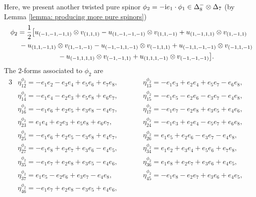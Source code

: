 \documentclass[pdftex]{sigma}
\numberwithin{equation}{section}
\begin{document}
{\allowdisplaybreaks Here, we present another twisted pure spinor $\phi_2=-{\rm i}e_1\cdot \phi_1 \in \Delta_8^-\otimes \Delta_7$ (by Lemma \ref{lemma: producing more pure spinors})
\begin{gather*}
\phi_2 ={1\over 2}\big[ u_{(-1,-1,-1,1)}\otimes v_{(1,1,1)} -u_{(1,-1,-1,-1)}\otimes v_{(1,1,-1)}
 + u_{(1,-1,1,1)}\otimes v_{(1,-1,1)} \\
 \hphantom{\phi_2 =}{} - u_{(1,1,-1,1)}\otimes v_{(1,-1,-1)} - u_{(-1,-1,1,-1)}\otimes v_{(-1,1,1)} + u_{(-1,1,-1,-1)}\otimes v_{(-1,1,-1)}\\
\hphantom{\phi_2 =}{}
 - u_{(-1,1,1,1)}\otimes v_{(-1,-1,1)} + u_{(1,1,1,-1)}\otimes v_{(-1,-1,-1)}\big].
\end{gather*}
The $2$-forms associated to $\phi_2$ are
\begin{alignat*}{3}
& \eta^{\phi_2}_{1 2} = -e_{1} e_{2} - e_{3} e_{4} + e_{5} e_{6} + e_{7} e_{8},\qquad &&
 \eta^{\phi_2}_{1 3} = -e_{1} e_{3} + e_{2} e_{4} + e_{5} e_{7} - e_{6} e_{8},&\\
& \eta^{\phi_2}_{1 4} = -e_{1} e_{4} - e_{2} e_{3} + e_{5} e_{8} + e_{6} e_{7},\qquad &&
 \eta^{\phi_2}_{1 5} = -e_{1} e_{5} - e_{2} e_{6} - e_{3} e_{7} - e_{4} e_{8},&\\
& \eta^{\phi_2}_{1 6} = -e_{1} e_{6} + e_{2} e_{5} + e_{3} e_{8} - e_{4} e_{7},\qquad &&
 \eta^{\phi_2}_{1 7} = -e_{1} e_{7} - e_{2} e_{8} + e_{3} e_{5} + e_{4} e_{6},&\\
& \eta^{\phi_2}_{2 3} = e_{1} e_{4} + e_{2} e_{3} + e_{5} e_{8} + e_{6} e_{7},\qquad &&
 \eta^{\phi_2}_{2 4} = -e_{1} e_{3} + e_{2} e_{4} - e_{5} e_{7} + e_{6} e_{8},&\\
& \eta^{\phi_2}_{2 5} = -e_{1} e_{6} + e_{2} e_{5} - e_{3} e_{8} + e_{4} e_{7},\qquad &&
 \eta^{\phi_2}_{2 6} = e_{1} e_{5} + e_{2} e_{6} - e_{3} e_{7} - e_{4} e_{8},&\\
& \eta^{\phi_2}_{2 7} = -e_{1} e_{8} + e_{2} e_{7} + e_{3} e_{6} - e_{4} e_{5},\qquad &&
 \eta^{\phi_2}_{3 4} = e_{1} e_{2} + e_{3} e_{4} + e_{5} e_{6} + e_{7} e_{8},&\\
& \eta^{\phi_2}_{3 5} = -e_{1} e_{7} + e_{2} e_{8} + e_{3} e_{5} - e_{4} e_{6},\qquad &&
 \eta^{\phi_2}_{3 6} = e_{1} e_{8} + e_{2} e_{7} + e_{3} e_{6} + e_{4} e_{5},&\\
& \eta^{\phi_2}_{3 7} = e_{1} e_{5} - e_{2} e_{6} + e_{3} e_{7} - e_{4} e_{8},\qquad &&
 \eta^{\phi_2}_{4 5} = -e_{1} e_{8} - e_{2} e_{7} + e_{3} e_{6} + e_{4} e_{5},&\\
& \eta^{\phi_2}_{4 6} = -e_{1} e_{7} + e_{2} e_{8} - e_{3} e_{5} + e_{4} e_{6},\qquad &&

\end{alignat*}}
\end{document}
